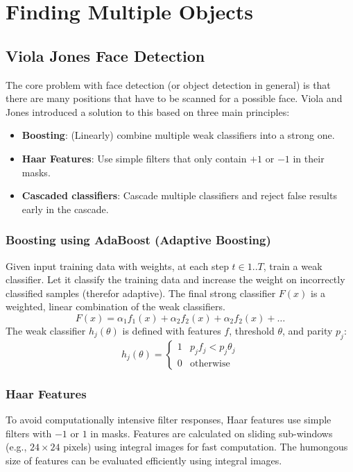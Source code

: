\section{Finding Multiple Objects}


\subsection{Viola Jones Face Detection}

The core problem with face detection (or object detection in general) is that there are many positions that have to be scanned for a possible face.
Viola and Jones introduced a solution to this based on three main principles:
\begin{itemize}
	\item \textbf{Boosting}: (Linearly) combine multiple weak classifiers into a strong one.
	\item \textbf{Haar Features}: Use simple filters that only contain \(+1\) or \(-1\) in their masks.
	\item \textbf{Cascaded classifiers}: Cascade multiple classifiers and reject false results early in the cascade.
\end{itemize}

\subsubsection{Boosting using AdaBoost (Adaptive Boosting)}
Given input training data with weights, at each step $t \in 1..T$, train a weak classifier.
Let it classify the training data and increase the weight on incorrectly classified samples (therefor adaptive).
The final strong classifier $F(x)$ is a weighted, linear combination of the weak classifiers.
\[
F(x) = \alpha_1 f_1(x) + \alpha_2 f_2(x) + \alpha_2 f_2(x) + \dots
\]
The weak classifier $h_j (\theta)$ is defined with features $f$, threshold $\theta$, and parity $p_j$:
\[
h_j (\theta) = \begin{cases}
1 & p_j f_j < p_j \theta_j \\
0 & \text{otherwise}
\end{cases}
\]

\subsubsection{Haar Features}
To avoid computationally intensive filter responses, Haar features use simple filters with $-1$ or $1$ in masks.
Features are calculated on sliding sub-windows (e.g., $24\times24$ pixels) using integral images for fast computation.
The humongous size of features can be evaluated efficiently using integral images.

